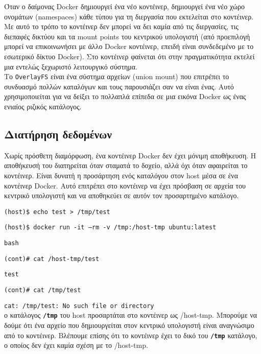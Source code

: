 Όταν ο δαίμονας \textlatin{Docker} δημιουργεί ένα νέο κοντέινερ, δημιουργεί ένα
νέο
χώρο ονομάτων (\textlatin{namespaces}) κάθε τύπου για τη διεργασία που
εκτελείται στο κοντέινερ. Με αυτό το τρόπο το κοντέινερ δεν μπορεί να δει καμία
από τις διεργασίες, τις διεπαφές δικτύου και τα \textlatin{mount points} του
κεντρικού υπολογιστή (από προεπιλογή μπορεί
να επικοινωνήσει με άλλο \textlatin{Docker} κοντέινερ, επειδή είναι συνδεδεμένο
με το εσωτερικό δίκτυο \textlatin{Docker}). Στο κοντέινερ φαίνεται ότι στην
πραγματικότητα εκτελεί μια εντελώς ξεχωριστό λειτουργικό σύστημα. \\

Το \texttt{\textlatin{OverlayFS}} είναι ένα σύστημα αρχείων 
(\textlatin{union mount}) που επιτρέπει το συνδυασμό πολλών
καταλόγων και τους παρουσιάζει σαν να είναι ένας. Αυτό χρησιμοποιείται για να
δείξει το πολλαπλά επίπεδα σε μια εικόνα Docker ως ένας ενιαίος ριζικός
κατάλογος.

\subsection{Διατήρηση δεδομένων}

Χωρίς πρόσθετη διαμόρφωση, ένα κοντέινερ \textlatin{Docker} δεν έχει μόνιμη
αποθήκευση. Η αποθήκευσή του διατηρείται όταν σταματά το δοχείο, αλλά
όχι όταν αφαιρείται το κοντέινερ. Είναι δυνατή η προσάρτηση ενός καταλόγου
στον \textlatin{host} μέσα σε ένα κοντέινερ \textlatin{Docker}. Αυτό επιτρέπει
στο κοντέινερ να έχει πρόσβαση σε αρχεία του κεντρικό υπολογιστή και να
αποθηκεύει σε αυτόν τον προσαρτημένο κατάλογο.


\texttt{\textlatin{(host)\$ echo test > /tmp/test}}

\texttt{\textlatin{(host)\$ docker run -it --rm -v /tmp:/host-tmp ubuntu:latest}}

\texttt{\textlatin{bash}}

\texttt{\textlatin{(cont)\# cat /host-tmp/test}}

\texttt{\textlatin{test}}

\texttt{\textlatin{(cont)\# cat /tmp/test}}

\texttt{\textlatin{cat: /tmp/test: No such file or directory}} \\

ο κατάλογος \textbf{\texttt{\textlatin{/tmp}}} του \textlatin{host} προσαρτάται
στο κοντέινερ ως \textlatin{/host-tmp}. Μπορούμε να δούμε ότι ένα αρχείο που
δημιουργείται στον κεντρικό υπολογιστή είναι αναγνώσιμο από το κοντέινερ.
Βλέπουμε επίσης ότι το κοντέινερ έχει το δικό του
\textbf{\texttt{\textlatin{/tmp}}} κατάλογο, ο οποίος δεν έχει καμία σχέση με το
\textlatin{/host-tmp}.

